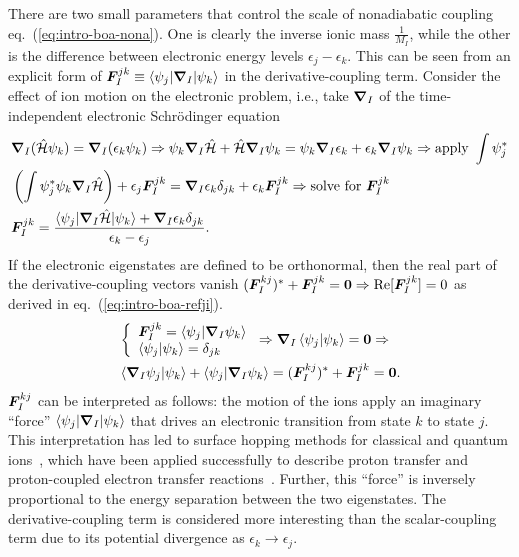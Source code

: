 There are two small parameters that control the scale of nonadiabatic coupling eq.~(\ref{eq:intro-boa-nona}). One is clearly the inverse ionic mass $\frac{1}{M_I}$, while the other is the difference between electronic energy levels $\epsilon_j-\epsilon_k$. This can be seen from an explicit form of $\boldsymbol{F}_I^{jk}\equiv\braket{\psi_j|\boldsymbol{\nabla}_I|\psi_k}$ in the derivative-coupling term. Consider the effect of ion motion on the electronic problem, i.e., take $\boldsymbol{\nabla}_I$ of the time-independent electronic Schr\"odinger equation
\begin{align}
&\boldsymbol{\nabla}_I(\hat{\mathcal{H}}\psi_k) = \boldsymbol{\nabla}_I(\epsilon_k\psi_k ) \Rightarrow \psi_k\boldsymbol{\nabla}_I\hat{\mathcal{H}} + \hat{\mathcal{H}}\boldsymbol{\nabla}_I\psi_k = \psi_k\boldsymbol{\nabla}_I\epsilon_k + \epsilon_k\boldsymbol{\nabla}_I\psi_k \Rightarrow \nonumber \text{apply }\int\psi_j^* \\ &\left(\int \psi_j^*\psi_k\boldsymbol{\nabla}_I\hat{\mathcal{H}}\right) + \epsilon_j \boldsymbol{F}_I^{jk} = \boldsymbol{\nabla}_I\epsilon_k \delta_{jk}+\epsilon_k\boldsymbol{F}_I^{jk} \Rightarrow \nonumber \text{solve for }\boldsymbol{F}_I^{jk} \\
&\boldsymbol{F}_I^{jk} = \dfrac{\braket{\psi_j|\boldsymbol{\nabla}_I\hat{\mathcal{H}}|\psi_k}+\boldsymbol{\nabla}_I\epsilon_k\delta_{jk}}{\epsilon_k-\epsilon_j}.
\end{align}
If the electronic eigenstates are defined to be orthonormal, then the real part of the derivative-coupling vectors vanish $(\boldsymbol{F}_I^{kj})^*+\boldsymbol{F}_I^{jk}=\boldsymbol{0} \Rightarrow \text{Re}[\boldsymbol{F}_I^{jk}]=0$ as derived in eq.~(\ref{eq:intro-boa-refji}).
\begin{align}
&\left\{\begin{array}{l}
\boldsymbol{F}^{jk}_I = \braket{\psi_j|\boldsymbol{\nabla}_I\psi_k} \\
\braket{\psi_j|\psi_k} = \delta_{jk}
\end{array}\right. \Rightarrow \boldsymbol{\nabla}_I \braket{\psi_j|\psi_k} = \boldsymbol{0} \nonumber \Rightarrow \\
& \braket{\boldsymbol{\nabla}_I\psi_j|\psi_k} + \braket{\psi_j|\boldsymbol{\nabla}_I\psi_k}   = (\boldsymbol{F}_I^{kj})^*+\boldsymbol{F}_I^{jk} = \boldsymbol{0}.
\label{eq:intro-boa-refji}
\end{align}
$\boldsymbol{F}_I^{kj}$ can be interpreted as follows: the motion of the ions apply an imaginary ``force'' $\braket{\psi_j|\boldsymbol{\nabla}_I|\psi_k}$ that drives an electronic transition from state $k$ to state $j$. This interpretation has led to surface hopping methods for classical and quantum ions~\cite{Hammes-Schiffer1995,Sholl1998}, which have been applied successfully to describe proton transfer and proton-coupled electron transfer reactions~\cite{Hammes-Schiffer2015}. Further, this ``force'' is inversely proportional to the energy separation between the two eigenstates. The derivative-coupling term is considered more interesting than the scalar-coupling term due to its potential divergence as $\epsilon_k\rightarrow\epsilon_j$.

